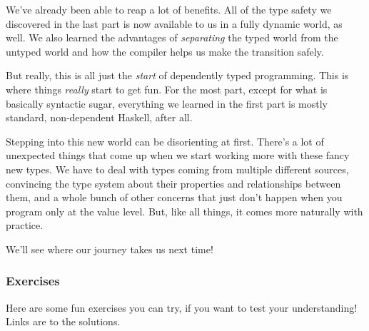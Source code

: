 \documentclass[]{article}
\begin{document}
We've already been able to reap a lot of benefits. All of the type safety we
discovered in the last part is now available to us in a fully dynamic world, as
well. We also learned the advantages of \emph{separating} the typed world from
the untyped world and how the compiler helps us make the transition safely.

But really, this is all just the \emph{start} of dependently typed programming.
This is where things \emph{really} start to get fun. For the most part, except
for what is basically syntactic sugar, everything we learned in the first part
is mostly standard, non-dependent Haskell, after all.

Stepping into this new world can be disorienting at first. There's a lot of
unexpected things that come up when we start working more with these fancy new
types. We have to deal with types coming from multiple different sources,
convincing the type system about their properties and relationships between
them, and a whole bunch of other concerns that just don't happen when you
program only at the value level. But, like all things, it comes more naturally
with practice.

We'll see where our journey takes us next time!

\subsubsection{Exercises}\label{exercises}

Here are some fun exercises you can try, if you want to test your understanding!
Links are to the solutions.
\end{document}

